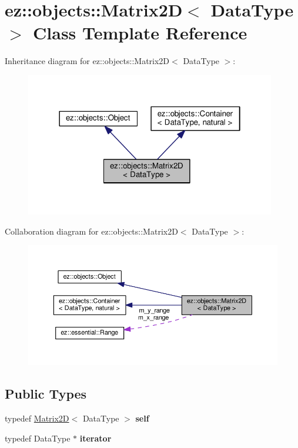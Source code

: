 \hypertarget{classez_1_1objects_1_1Matrix2D}{}\section{ez\+:\+:objects\+:\+:Matrix2D$<$ Data\+Type $>$ Class Template Reference}
\label{classez_1_1objects_1_1Matrix2D}


Inheritance diagram for ez\+:\+:objects\+:\+:Matrix2D$<$ Data\+Type $>$\+:
\nopagebreak
\begin{figure}[H]
\begin{center}
\leavevmode
\includegraphics[width=310pt]{classez_1_1objects_1_1Matrix2D__inherit__graph}
\end{center}
\end{figure}


Collaboration diagram for ez\+:\+:objects\+:\+:Matrix2D$<$ Data\+Type $>$\+:
\nopagebreak
\begin{figure}[H]
\begin{center}
\leavevmode
\includegraphics[width=350pt]{classez_1_1objects_1_1Matrix2D__coll__graph}
\end{center}
\end{figure}
\subsection*{Public Types}
\begin{DoxyCompactItemize}
\item 
\mbox{\label{classez_1_1objects_1_1Matrix2D_aed7325d5d1ae52ffd652dc6f5424961a}} 
typedef \hyperlink{classez_1_1objects_1_1Matrix2D}{Matrix2D}$<$ Data\+Type $>$ {\bfseries self}
\item 
\mbox{\label{classez_1_1objects_1_1Matrix2D_a0fc564d5a00d0145ca6b2986b797649b}} 
typedef Data\+Type $\ast$ {\bfseries iterator}
\end{DoxyCompactItemize}
